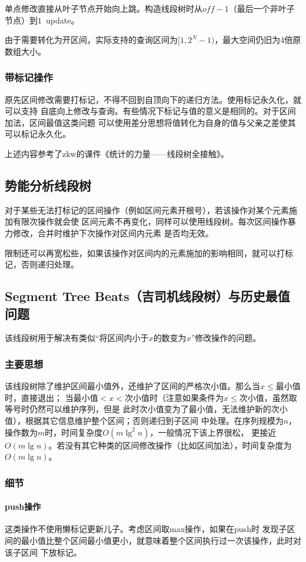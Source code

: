 单点修改直接从叶子节点开始向上跳。构造线段树时从$off-1$（最后一个非叶子节点）到$1$~update。

由于需要转化为开区间，实际支持的查询区间为$[1,2^N-1)$，最大空间仍旧为4倍原数组大小。
\subsubsection{带标记操作}
原先区间修改需要打标记，不得不回到自顶向下的递归方法。使用标记永久化，就可以支持
自底向上修改与查询。有些情况下标记与值的意义是相同的。对于区间加法，区间最值这类问题
可以使用差分思想将值转化为自身的值与父亲之差使其可以标记永久化。

上述内容参考了zkw的课件《统计的力量——线段树全接触》。
\subsection{势能分析线段树}
对于某些无法打标记的区间操作（例如区间元素开根号），若该操作对某个元素施加有限次操作就会使
区间元素不再变化，同样可以使用线段树。每次区间操作暴力修改，合并时维护下次操作对区间内元素
是否均无效。

限制还可以再宽松些，如果该操作对区间内的元素施加的影响相同，就可以打标记，否则递归处理。
\subsection{Segment Tree Beats（吉司机线段树）与历史最值问题}
该线段树用于解决有类似``将区间内小于$x$的数变为$x$''修改操作的问题。
\subsubsection{主要思想}

该线段树除了维护区间最小值外，还维护了区间的严格次小值。那么当$x\leq$最小值时，直接退出；
当最小值$<x<$次小值时（注意如果条件为$x\leq$次小值，虽然取等号时仍然可以维护序列，但是
此时次小值变为了最小值，无法维护新的次小值），根据其它信息维护整个区间；否则递归到子区间
中处理。在序列规模为$n$，操作数为$m$时，时间复杂度$O(m\lg^2 n)$，一般情况下该上界很松，
更接近$O(m\lg n)$。若没有其它种类的区间修改操作（比如区间加法），时间复杂度为$O(m\lg n)$。
\subsubsection{细节}
\paragraph{push操作}这类操作不使用懒标记更新儿子。考虑区间取max操作，如果在push时
发现子区间的最小值比整个区间最小值更小，就意味着整个区间执行过一次该操作，此时对该子区间
下放标记。

